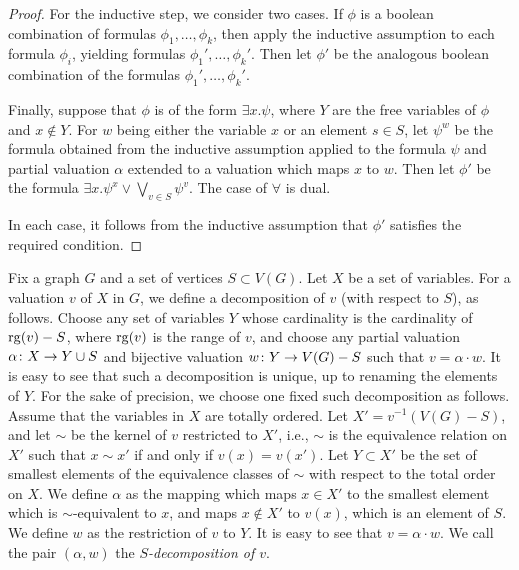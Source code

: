 \begin{proof}
For the inductive step, we consider two cases.
If $\phi$ is a boolean combination of formulas $\phi_1,\ldots,\phi_k$, then 
apply the inductive assumption to each formula $\phi_i$,
yielding formulas $\phi_1',\ldots,\phi_k'$. Then let $\phi'$ be the analogous boolean combination of the formulas $\phi_1',\ldots,\phi_k'$.

Finally, suppose that $\phi$ is of the form $\exists x.\psi$, where   $Y$ are the free variables of $\phi$ and $x\not \in Y$.
 For $w$ being either the variable $x$ 
or an element $s\in S$, 
let $\psi^w$ be the formula obtained from the inductive assumption applied to the formula $\psi$ 
and partial valuation $\alpha$ extended to a valuation which maps  $x$ to $w$. 
Then let $\phi'$
be the formula $\exists x.\psi^x \lor \bigvee_{v\in S}\psi^v$.
The case of $\forall$ is dual.

In each case, it follows from the inductive assumption that $\phi'$ 
satisfies the required condition.
\end{proof}

Fix a graph $G$  and a set of vertices  $S\subset V(G)$.
%
Let $X$ be a set of variables.
For a valuation  $v$ of $X$ in $G$, we define 
a {decomposition} of $v$ (with respect to $S$), as follows.
Choose any set of variables $Y$ whose cardinality 
is the cardinality of $\mathrm{rg}(v)-S$, where $\mathrm{rg}(v)$ is the range of $v$, and  choose any partial valuation  $\alpha\colon X\to Y\cup S$ and bijective valuation $w\colon Y\to V(G)-S$ such that $v=\alpha\cdot w$. It is easy to see that such a decomposition is unique, up to renaming the elements of $Y$. For the sake of precision, we choose one fixed such decomposition as follows.
Assume that the variables in $X$ are totally ordered. 
Let $X'=v^{-1}(V(G)-S)$, and let $\sim$  be the kernel of $v$ restricted to $X'$, i.e., 
$\sim$ is the equivalence relation on $X'$ such that $x\sim x'$ if and only if $v(x)=v(x')$. Let $Y\subset X'$ be the set of smallest elements of the equivalence classes of $\sim$ with respect to the total order on $X$. We define $\alpha$ as the mapping which maps $x\in X'$ to the smallest element which is $\sim$-equivalent to $x$, and maps $x\not\in X'$ to $v(x)$, which is an element of $S$.
We define $w$ as the restriction of $v$ to $Y$. It is easy to see that $v=\alpha\cdot w$. We call the pair $(\alpha,w)$ the \emph{$S$-decomposition of $v$}.


